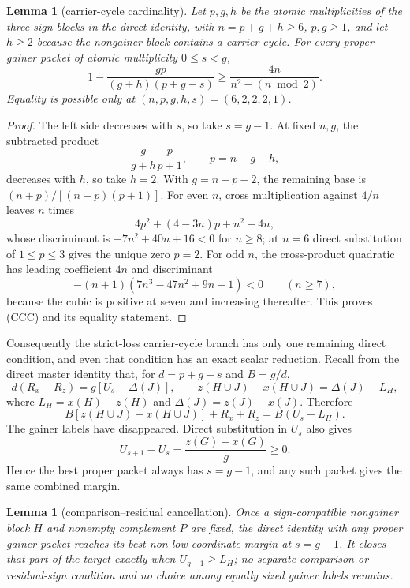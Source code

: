 \documentclass[11pt]{article}
\newtheorem{lemma}[theorem]{Lemma}
\begin{document}
\begin{lemma}[carrier-cycle cardinality]
Let $p,g,h$ be the atomic multiplicities of the three sign blocks in the
direct identity, with $n=p+g+h\ge6$, $p,g\ge1$, and let $h\ge2$ because the
nongainer block contains a carrier cycle.  For every proper gainer packet of
atomic multiplicity $0\le s<g$,
\[
 1-\frac{gp}{(g+h)(p+g-s)}
 \ge \frac{4n}{n^2-(n\bmod2)}.                       \tag{CCC}
\]
Equality is possible only at $(n,p,g,h,s)=(6,2,2,2,1)$.
\end{lemma}

\begin{proof}
The left side decreases with $s$, so take $s=g-1$.  At fixed $n,g$, the
subtracted product
\[
 \frac{g}{g+h}\frac{p}{p+1},\qquad p=n-g-h,
\]
decreases with $h$, so take $h=2$.  With $g=n-p-2$, the remaining base is
$(n+p)/[(n-p)(p+1)]$.  For even $n$, cross multiplication against $4/n$
leaves $n$ times
\[
 4p^2+(4-3n)p+n^2-4n,
\]
whose discriminant is $-7n^2+40n+16<0$ for $n\ge8$; at $n=6$ direct
substitution of $1\le p\le3$ gives the unique zero $p=2$.  For odd $n$, the
cross-product quadratic has leading coefficient $4n$ and discriminant
\[
 -(n+1)(7n^3-47n^2+9n-1)<0\qquad(n\ge7),
\]
because the cubic is positive at seven and increasing thereafter.  This
proves (CCC) and its equality statement.
\end{proof}

Consequently the strict-loss carrier-cycle branch has only one remaining
direct condition, and even that condition has an exact scalar reduction.
Recall from the direct master identity that, for $d=p+g-s$ and
$B=g/d$,
\[
 d(R_x+R_z)=g[U_s-\Delta(J)],\qquad
 z(H\cup J)-x(H\cup J)=\Delta(J)-L_H,                \tag{CB1}
\]
where $L_H=x(H)-z(H)$ and $\Delta(J)=z(J)-x(J)$.
Therefore
\[
 B[z(H\cup J)-x(H\cup J)]+R_x+R_z=B(U_s-L_H).       \tag{CB2}
\]
The gainer labels have disappeared.  Direct substitution in $U_s$ also gives
\[
 U_{s+1}-U_s=\frac{z(G)-x(G)}g\ge0.                 \tag{CB3}
\]
Hence the best proper packet always has $s=g-1$, and any such packet gives
the same combined margin.

\begin{lemma}[comparison--residual cancellation]
Once a sign-compatible nongainer block $H$ and nonempty complement $P$ are
fixed, the direct identity with any proper gainer packet reaches its best
non-low-coordinate margin at $s=g-1$.  It closes that part of the target
exactly when $U_{g-1}\ge L_H$; no separate comparison or residual-sign
condition and no choice among equally sized gainer labels remains.
\end{lemma}
\end{document}
